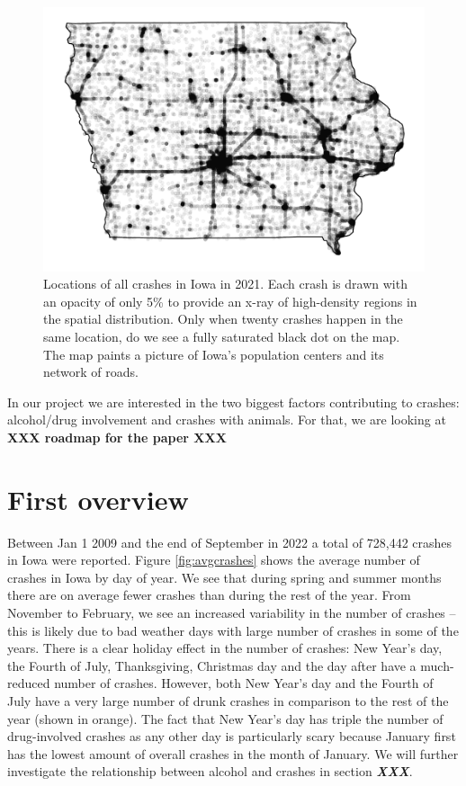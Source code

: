 \documentclass[conference,final,]{IEEEtran}
\begin{document}
\begin{figure}

{\centering \includegraphics[width=0.9\columnwidth]{CAUSE_files/figure-latex/map-1} 

}

\caption{Locations of all crashes in Iowa in 2021. Each crash is drawn with an opacity of only 5\% to provide an x-ray of high-density regions in the spatial distribution. Only when twenty crashes happen in the same location, do we see a fully saturated black dot on the map. The map paints a picture of Iowa's population centers and its network of roads.}\label{fig:map}
\end{figure}

In our project we are interested in the two biggest factors contributing to crashes: alcohol/drug involvement and crashes with animals. For that, we are looking at \textbf{XXX roadmap for the paper XXX}

\hypertarget{first-overview}{%
\section{First overview}\label{first-overview}}

Between Jan 1 2009 and the end of September in 2022 a total of 728,442 crashes in Iowa were reported. Figure \ref{fig:avgcrashes} shows the average number of crashes in Iowa by day of year. We see that during spring and summer months there are on average fewer crashes than during the rest of the year. From November to February, we see an increased variability in the number of crashes -- this is likely due to bad weather days with large number of crashes in some of the years. There is a clear holiday effect in the number of crashes: New Year's day, the Fourth of July, Thanksgiving, Christmas day and the day after have a much-reduced number of crashes. However, both New Year's day and the Fourth of July have a very large number of drunk crashes in comparison to the rest of the year (shown in orange). The fact that New Year's day has triple the number of drug-involved crashes as any other day is particularly scary because January first has the lowest amount of overall crashes in the month of January. We will further investigate the relationship between alcohol and crashes in section \textbf{\emph{XXX}}.
\end{document}
